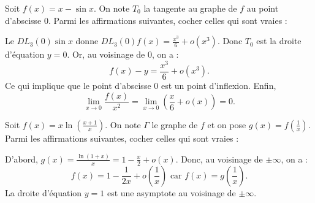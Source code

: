 \begin{question}
Soit $\displaystyle f(x)=x-\sin x$. On note $T_0$ la tangente au graphe de $f$ au point d'abscisse $0$. Parmi les affirmations suivantes, cocher celles qui sont vraies :
\begin{answers}  
\end{answers}
\begin{explanations}
Le $DL_3(0)\sin x$ donne $\displaystyle DL_3(0)f(x)=\frac{x^3}{6}+o(x^3)$. Donc $T_0$ est la droite d'équation $y=0$. Or, au voisinage de $0$, on a :
$$f(x)-y=\frac{x^3}{6}+o(x^3).$$
Ce qui implique que le point d'abscisse $0$ est un point d'inflexion. Enfin, 
$$\displaystyle \lim _{x\to 0}\frac{f(x)}{x^2}=\lim _{x\to 0}\left(\frac{x}{6}+o(x)\right)=0.$$
\end{explanations}
\end{question}


\begin{question}
Soit $\displaystyle f(x)=x\ln \left(\frac{x+1}{x}\right)$. On note $\Gamma$ le graphe de $f$ et on pose $\displaystyle g(x)=f\left(\frac{1}{x}\right)$. Parmi les affirmations suivantes, cocher celles qui sont vraies :
\begin{answers}  
\end{answers}
\begin{explanations}
D'abord, $\displaystyle g(x)=\frac{\ln (1+x)}{x}=1-\frac{x}{2}+o(x)$. Donc, au voisinage de $\pm\infty$, on a :
$$f(x)=1-\frac{1}{2x}+o\left(\frac{1}{x}\right)\mbox{ car }f(x)=g\left(\frac{1}{x}\right).$$
La droite d'équation $y=1$ est une asymptote au voisinage de $\pm\infty$.
\end{explanations}
\end{question}

